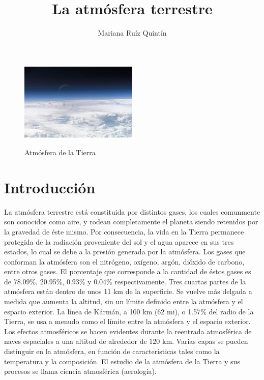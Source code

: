 \documentclass{article}
\title{La atmósfera terrestre}
\author{Mariana Ruíz Quintín}
\begin{document}
\maketitle

\begin{figure}
   \caption{Atmósfera de la Tierra}
   \includegraphics[width=0.5\textwidth]{Top_of_Atmosphere.jpg}%
   \centering
   \label{Atmósfera de la Tierra}%
  \end{figure}
  
 
  
\section{Introducción}

 
La atmósfera terrestre está constituida por distintos gases, los cuales comunmente son conocidos como aire, y rodean completamente el planeta siendo retenidos por la gravedad de éste mismo. Por consecuencia, la vida en la Tierra permanece protegida de la radiación proveniente del sol y el agua aparece en sus tres estados, lo cual se debe a la presión generada por la atmósfera. 
  Los gases que conforman la atmósfera son el nitrógeno, oxígeno, argón, dióxido de carbono, entre otros gases. El porcentaje que corresponde a la cantidad de éstos gases es de 78.09\%, 20.95\%, 0.93\% y 0.04\% respectivamente.
Tres cuartas partes de la atmósfera están dentro de unos 11 km de la superficie. Se vuelve más delgada a medida que aumenta la altitud, sin un límite definido entre la atmósfera y el espacio exterior. La línea de Kármán, a 100 km (62 mi), o 1.57\% del radio de la Tierra, se usa a menudo como el límite entre la atmósfera y el espacio exterior. Los efectos atmosféricos se hacen evidentes durante la reentrada atmosférica de naves espaciales a una altitud de alrededor de 120 km. Varias capas se pueden distinguir en la atmósfera, en función de características tales como la temperatura y la composición. El estudio de la atmósfera de la Tierra y sus procesos se llama ciencia atmosférica (aerología).
  
\end{document}
